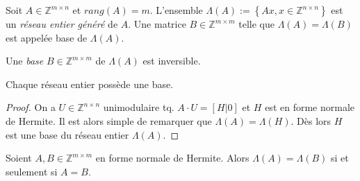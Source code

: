   \begin{definition}
    \label{def:49}
    Soit $A \in \mathbb{Z}^{m\times n}$ et  $rang(A)=m$. L'ensemble  $\Lambda(A):=\left\{ Ax,x\in \mathbb{Z}^{n\times n} \right\}$ est  un \emph{réseau entier généré}  de $A$. Une matrice  $B \in \mathbb{Z}^{m\times m}$ telle que  $\Lambda(A)=\Lambda(B)$ est appelée base de $\Lambda(A)$. 
  \end{definition}

  \begin{remark}
    Une  \emph{base} $B ∈ ℤ^{m ×m}$  de $Λ(A)$ est inversible. 
  \end{remark}
	
 \begin{corollary}
    \label{co:9}
    Chaque réseau entier possède une base.
  \end{corollary}


  \begin{proof}
    On a $U ∈ℤ^{ n ×n}$ unimodulaire tq. $A ⋅ U = [H | 0]$ et $H$ est
    en forme normale de Hermite. Il est alors simple de remarquer que
    $\Lambda(A)=\Lambda(H)$. Dès lors $H$ est une base du réseau
    entier $Λ(A)$.
  \end{proof}

  \begin{theorem}
    \label{thr:28}
    Soient $A,B \in \mathbb{Z}^{m\times m}$ en forme normale de Hermite.    Alors $Λ(A) = Λ(B)$ si et seulement si $A = B$. 
  \end{theorem}

